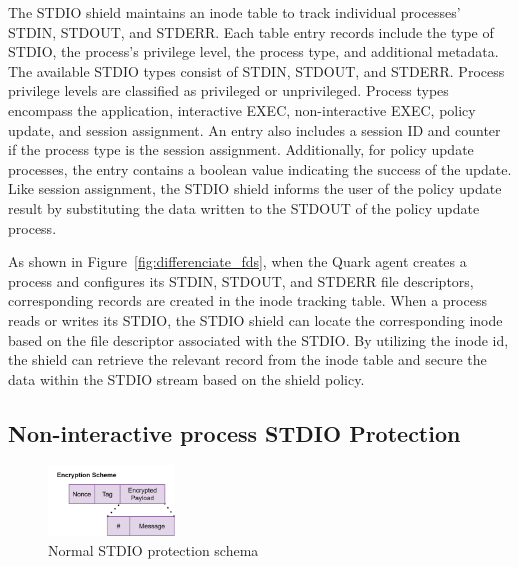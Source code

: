 The STDIO shield maintains an inode table to track individual processes' STDIN, STDOUT, and STDERR. Each table entry records include the type of STDIO, the process's privilege level, the process type, and additional metadata. The available STDIO types consist of STDIN, STDOUT, and STDERR. Process privilege levels are classified as 
privileged or unprivileged. Process types encompass the application, interactive EXEC, non-interactive EXEC, policy update, and session assignment. An entry also includes a session ID and counter if the process type is the session assignment. Additionally, for policy update processes, the entry contains a boolean 
value indicating the success of the update. Like session assignment, the STDIO shield informs the user of the policy update result by substituting the data written to the STDOUT of the policy update process.

As shown in Figure~\ref{fig:differenciate_fds}, when the Quark agent creates a process and configures its STDIN, STDOUT, and STDERR file descriptors, corresponding records are created in the inode tracking table. When a process reads or writes its STDIO, the STDIO shield can locate the corresponding inode based on the file descriptor associated 
with the STDIO. By utilizing the inode id, the shield can retrieve the relevant record from the inode table and secure the data within the STDIO stream based on the shield policy.

\subsection{Non-interactive process STDIO Protection}

\begin{figure}[!htb]
    \centering
    \includegraphics[width=0.3\textwidth]{images/normal_io_shiled_encryption_schema.png}
    \caption[Normal STDIO protection schema]{Normal STDIO protection schema}
    \label{fig:normal_io_shiled}
\end{figure}

